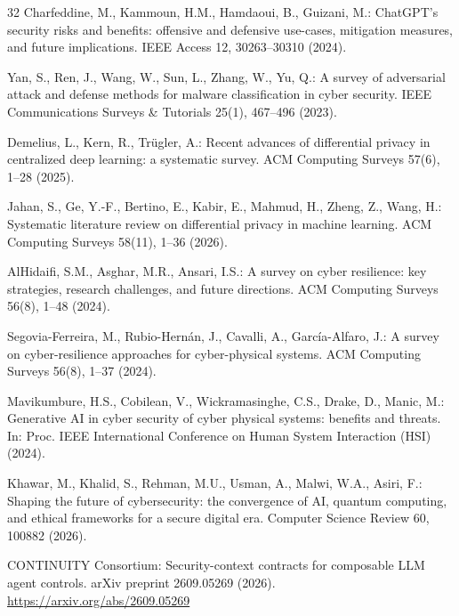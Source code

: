 \documentclass[runningheads]{llncs}
\begin{document}
\begin{thebibliography}{32}
Charfeddine, M., Kammoun, H.M., Hamdaoui, B., Guizani, M.: ChatGPT's security risks and benefits: offensive and defensive use-cases, mitigation measures, and future implications. IEEE Access 12, 30263--30310 (2024). 

Yan, S., Ren, J., Wang, W., Sun, L., Zhang, W., Yu, Q.: A survey of adversarial attack and defense methods for malware classification in cyber security. IEEE Communications Surveys \& Tutorials 25(1), 467--496 (2023). 

Demelius, L., Kern, R., Tr\"ugler, A.: Recent advances of differential privacy in centralized deep learning: a systematic survey. ACM Computing Surveys 57(6), 1--28 (2025). 

Jahan, S., Ge, Y.-F., Bertino, E., Kabir, E., Mahmud, H., Zheng, Z., Wang, H.: Systematic literature review on differential privacy in machine learning. ACM Computing Surveys 58(11), 1--36 (2026). 

AlHidaifi, S.M., Asghar, M.R., Ansari, I.S.: A survey on cyber resilience: key strategies, research challenges, and future directions. ACM Computing Surveys 56(8), 1--48 (2024). 

Segovia-Ferreira, M., Rubio-Hern\'an, J., Cavalli, A., Garc\'ia-Alfaro, J.: A survey on cyber-resilience approaches for cyber-physical systems. ACM Computing Surveys 56(8), 1--37 (2024). 

Mavikumbure, H.S., Cobilean, V., Wickramasinghe, C.S., Drake, D., Manic, M.: Generative AI in cyber security of cyber physical systems: benefits and threats. In: Proc. IEEE International Conference on Human System Interaction (HSI) (2024). 

Khawar, M., Khalid, S., Rehman, M.U., Usman, A., Malwi, W.A., Asiri, F.: Shaping the future of cybersecurity: the convergence of AI, quantum computing, and ethical frameworks for a secure digital era. Computer Science Review 60, 100882 (2026). 

CONTINUITY Consortium: Security-context contracts for composable LLM agent controls. arXiv preprint 2609.05269 (2026). \url{https://arxiv.org/abs/2609.05269}


\end{thebibliography}
\end{document}
